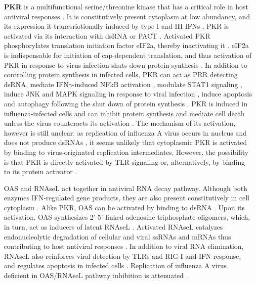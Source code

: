 		\textbf{\gls{PKR}} is a multifunctional serine/threonine kinase that has a critical role in host antiviral responses \parencite{Garcia2006a}. It is constitutively present cytoplasm at low abundancy, and its expression it trancsriotionally induced by type I and III \gls{IFN}s \parencite{Meurs1990}. \gls{PKR} is activated via its interaction with dsRNA or \gls{PACT} \parencite{Li2006a}. Activated \gls{PKR} phosphorylates translation initiation factor \gls{eIF2a}, thereby inactivating it \parencite{Levin1978}. \gls{eIF2a} is indispensable for initiation of cap-dependent translation, and thus activation of \gls{PKR} in response to virus infection shuts down protein synthesis \parencite{Kimball1999}. In addition to controlling protein synthesis in infected cells, \gls{PKR} can act as \gls{PRR} detecting dsRNA, mediate \gls{IFN}$\gamma$-induced \gls{NFkB} activation \parencite{Deb2001}, modulate \gls{STAT}1 signaling \parencite{Wong1997}, induce \gls{JNK} and \gls{MAPK} signaling in response to viral infection \parencite{Chu1999}, induce apoptosis and autophagy following the shut down of protein synthesis \parencite{Gil2000, Talloczy2002}. \gls{PKR} is induced in influenza-infected cells and can inhibit protein synthesis and mediate cell death unless the virus counteracts its activation \parencite{Takizawa1996, Hatada1999}.  The mechanism of its activation, however is still unclear: as replication of influenza A virus occurs in nucleus and does not produce dsRNAs \parencite{Wisskirchen2011}, it seems unlikely that cytoplasmic \gls{PKR} is activated by binding to virus-originated replication intermediates. However, the possibility is that \gls{PKR} is directly activated by \gls{TLR} signaling \parencite{Jiang2003} or, alternatively, by binding to its protein activator \parencite{Garcia2006a}.
		
		\gls{OAS} and \gls{RNAseL} act together in antiviral RNA decay pathway. Although both enzymes \gls{IFN}-regulated gene products, they are also present constitutively in cell cytoplasm \parencite{Sadler2008}. Alike \gls{PKR}, \gls{OAS} can be activated by binding to dsRNA \parencite{Castelli1998}. Upon its activation, \gls{OAS} synthesizes 2'-5'-linked adenosine triphosphate oligomers, which, in turn, act as inducers of latent \gls{RNAseL} \parencite{Rebouillat1999}. Activated \gls{RNAseL} catalyzes endonucleolytic degradation of cellular and viral ssRNAs and mRNAs thus contributing to host antiviral responses \parencite{Dyer2006}. In addition to viral RNA elimination, \gls{RNAseL} also reinforces viral detection by \gls{TLR}s and \gls{RIG-I} and \gls{IFN} response, and regulates apoptosis in infected cells \parencite{Liang2006}. Replication of influenza A virus deficient in \gls{OAS}/\gls{RNAseL} pathway inhibition is attenuated \parencite{Min2006}.
		
